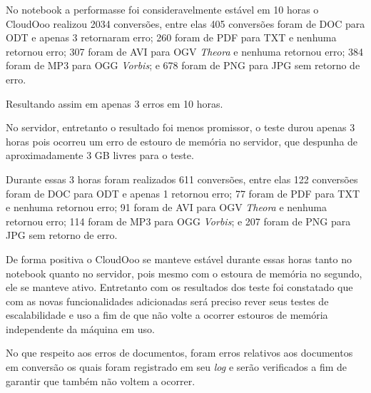 No notebook a performasse foi consideravelmente estável em 10 horas o CloudOoo realizou 2034 conversões, entre elas 405 conversões foram de DOC para ODT e apenas 3 retornaram erro; 260 foram de PDF para TXT e nenhuma retornou erro; 307 foram de AVI para OGV \textit{Theora} e nenhuma retornou erro; 384 foram de MP3 para OGG \textit{Vorbis}; e 678 foram de PNG para JPG sem retorno de erro.

Resultando assim em apenas 3 erros em 10 horas.

No servidor, entretanto o resultado foi menos promissor, o teste durou apenas 3 horas pois ocorreu um erro de estouro de memória no servidor, que despunha de aproximadamente 3 GB livres para o teste. 

Durante essas 3 horas foram realizados 611 conversões, entre elas 122 conversões foram de DOC para ODT e apenas 1 retornou erro; 77 foram de PDF para TXT e nenhuma retornou erro; 91 foram de AVI para OGV \textit{Theora} e nenhuma retornou erro; 114 foram de MP3 para OGG \textit{Vorbis}; e 207 foram de PNG para JPG sem retorno de erro.

De forma positiva o CloudOoo se manteve estável durante essas horas tanto no notebook quanto no servidor, pois mesmo com o estoura de memória no segundo, ele se manteve ativo. Entretanto com os resultados dos teste foi constatado que com as novas funcionalidades adicionadas será preciso rever seus testes de escalabilidade e uso a fim de que não volte a ocorrer estouros de memória independente da máquina em uso. 

No que respeito aos erros de documentos, foram erros relativos aos documentos em conversão os quais foram registrado em seu \textit{log} e serão verificados a fim de garantir que também não voltem a ocorrer.
